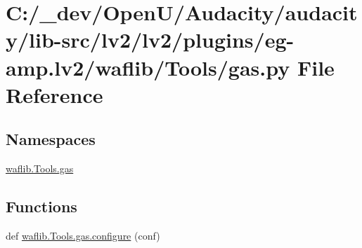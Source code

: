 \hypertarget{lv2_2plugins_2eg-amp_8lv2_2waflib_2_tools_2gas_8py}{}\section{C\+:/\+\_\+dev/\+Open\+U/\+Audacity/audacity/lib-\/src/lv2/lv2/plugins/eg-\/amp.lv2/waflib/\+Tools/gas.py File Reference}
\label{lv2_2plugins_2eg-amp_8lv2_2waflib_2_tools_2gas_8py}
\subsection*{Namespaces}
\begin{DoxyCompactItemize}
\item 
 \hyperlink{namespacewaflib_1_1_tools_1_1gas}{waflib.\+Tools.\+gas}
\end{DoxyCompactItemize}
\subsection*{Functions}
\begin{DoxyCompactItemize}
\item 
def \hyperlink{namespacewaflib_1_1_tools_1_1gas_ad1cc79a9a3edafdd0c92e0198ba5f802}{waflib.\+Tools.\+gas.\+configure} (conf)
\end{DoxyCompactItemize}
